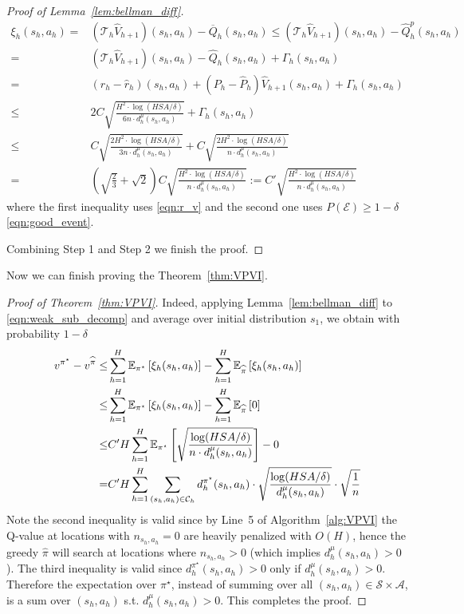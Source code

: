 \begin{proof}[Proof of Lemma~\ref{lem:bellman_diff}]
	{\small
	\begin{align*}
	\xi_h(s_h,a_h)=&(\mathcal{T}_h\widehat{V}_{h+1})(s_h,a_h)-\overline{Q}_h(s_h,a_h)\leq (\mathcal{T}_h\widehat{V}_{h+1})(s_h,a_h)-\widehat{Q}^p_h(s_h,a_h)\\
	=&(\mathcal{T}_h\widehat{V}_{h+1})(s_h,a_h)-\widehat{Q}_h(s_h,a_h)+\Gamma_h(s_h,a_h)\\
	=&(r_h-\widehat{r}_h)(s_h,a_h)+(P_h-\widehat{P}_h)\widehat{V}_{h+1}(s_h,a_h)+\Gamma_h(s_h,a_h)\\
	\leq &{2}C\sqrt{\frac{H^2\cdot\log(HSA/\delta)}{6n \cdot d^\mu_h{(s_h,a_h)}}}+\Gamma_h(s_h,a_h)\\
	\leq &C\sqrt{\frac{2H^2\cdot\log(HSA/\delta)}{3n \cdot d^\mu_h{(s_h,a_h)}}}+C\sqrt{\frac{2H^2\cdot\log(HSA/\delta)}{ n \cdot d^\mu_h{(s_h,a_h)}}}\\
	=&(\sqrt{\frac{2}{3}}+\sqrt{2})C\sqrt{\frac{H^2\cdot\log(HSA/\delta)}{ n \cdot d^\mu_h{(s_h,a_h)}}}:=C'\sqrt{\frac{H^2\cdot\log(HSA/\delta)}{ n \cdot d^\mu_h{(s_h,a_h)}}}
	\end{align*}
}where the first inequality uses \eqref{eqn:r_v} and the second one uses $P(\mathcal{E})\geq 1-\delta$ \eqref{eqn:good_event}.
	
	Combining Step 1 and Step 2 we finish the proof.
\end{proof}

Now we can finish proving the Theorem~\ref{thm:VPVI}. 

\begin{proof}[Proof of Theorem~\ref{thm:VPVI}]
	
	Indeed, applying Lemma~\ref{lem:bellman_diff} to \eqref{eqn:weak_sub_decomp} and average over initial distribution $s_1$, we obtain with probability $1-\delta$
	{\small
	\begin{align*}
	v^{\pi^\star}-v^{\widehat{\pi}}\leq& \sum_{h=1}^H\mathbb{E}_{\pi^\star}\left[\xi_h(s_h,a_h)\right]-\sum_{h=1}^H\mathbb{E}_{\widehat{\pi}}\left[\xi_h(s_h,a_h)\right]\\
	\leq & \sum_{h=1}^H\mathbb{E}_{\pi^\star}\left[\xi_h(s_h,a_h)\right]-\sum_{h=1}^H\mathbb{E}_{\widehat{\pi}}\left[0\right]\\
	\leq & C'H\sum_{h=1}^H\mathbb{E}_{\pi^\star}\left[\sqrt{\frac{\log(HSA/\delta)}{ n \cdot d^\mu_h{(s_h,a_h)}}}\right]-0\\
	=&C'H\sum_{h=1}^H\sum_{(s_h,a_h)\in\mathcal{C}_h}d^{\pi^\star}_h(s_h,a_h)\cdot\sqrt{\frac{\log(HSA/\delta)}{  d^\mu_h{(s_h,a_h)}}}\cdot \sqrt{\frac{1}{n}}
	\end{align*}}
	Note the second inequality is valid since by Line~5 of Algorithm~\ref{alg:VPVI} the Q-value at locations with $n_{s_h,a_h}=0$ are heavily penalized with $O(H)$, hence the greedy $\widehat{\pi}$ will search at locations where $n_{s_h,a_h}>0$ (which implies $d^\mu_h(s_h,a_h)>0$).
	The third inequality is valid since $d^{\pi^\star}_h(s_h,a_h)>0$ only if $d^\mu_h(s_h,a_h)>0$. Therefore the expectation over $\pi^\star$, instead of summing over all $(s_h,a_h)\in\mathcal{S}\times\mathcal{A}$, is a sum over $(s_h,a_h)$ s.t. $d^\mu_h(s_h,a_h)>0$. This completes the proof.
	
\end{proof}


